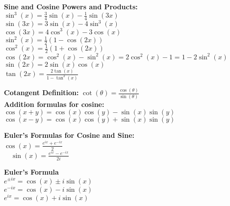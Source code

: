 \documentclass[a4paper,7pt,fleqn]{article}
\begin{document}
\begin{multicols}{3}
\begin{minipage}{\linewidth}
\textbf{Sine and Cosine Powers and Products:}
\(  \sin^3(x) = \frac{3}{4}\sin(x) - \frac{1}{4}\sin(3x) \) \\
\( \sin(3x) = 3\sin(x) - 4\sin^3(x) \) \\
\( \cos(3x) = 4\cos^3(x) - 3\cos(x) \) \\
\( \sin^2(x) = \frac{1}{2} (1 - \cos(2x))  \) \\
\( \cos^2(x)  = \frac{1}{2} (1 + \cos(2x)) \) \\

\( \cos(2x) = \cos^2(x) - \sin^2(x) = 2\cos^2(x) - 1 = 1 - 2\sin^2(x) \) \\
\( \sin(2x) = 2\sin(x)\cos(x) \) \\
\( \tan(2x) = \frac{2\tan(x)}{1-\tan^2(x)} \) \\
\end{minipage}
\begin{minipage}{\linewidth}
\textbf{Cotangent Definition:}
\( \cot(\theta) = \frac{\cos(\theta)}{\sin(\theta)} \) \\
\textbf{Addition formulas for cosine:}
\( \cos(x + y) = \cos(x)\cos(y) - \sin(x)\sin(y) \) \\
\( \cos(x - y) = \cos(x)\cos(y) + \sin(x)\sin(y) \) \\

\end{minipage}


\begin{minipage}{\linewidth}
\textbf{Euler's Formulas for Cosine and Sine:}\\
\( \cos(x) = \frac{e^{ix} + e^{-ix}}{2}\)\\
\(\quad \sin(x) = \frac{e^{ix} - e^{-ix}}{2i} \) \\
\end{minipage}

 \begin{minipage}{\linewidth}

\textbf{Euler's Formula} \\
\(     e^{\pm ix} = \cos(x) \pm i \sin(x) \) \\
\(     e^{-ix} = \cos(x) - i \sin(x) \) \\
\(     e^{ix} = \cos(x) + i \sin(x) \) \\












\end{minipage}
\end{multicols}
\end{document}
